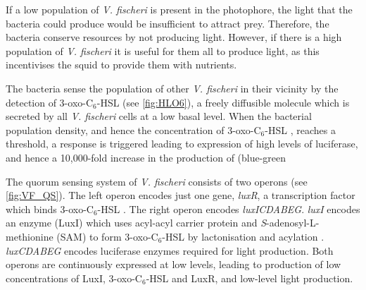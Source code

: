 If a low population  of \textit{V. fischeri} is  present  in  the  photophore,  the  light  that the bacteria could produce would  be insufficient to  attract prey. Therefore, the bacteria conserve resources by not producing light.
However, if there is a high population of \textit{V. fischeri} it is useful for them all to produce light, as this incentivises the squid to provide them with nutrients. 


The bacteria sense the population of other \textit{V. fischeri} in their vicinity by the detection of 3-oxo-C$_6$-HSL \cite{Eberhard1981} (see \ref{fig:HLO6}), a freely diffusible\cite{Kaplan1985} molecule which is secreted by all \textit{V. fischeri} cells\cite{Schaefer1996} at a low basal level\cite{Miller2001}. When the bacterial population density, and hence the concentration of 3-oxo-C$_6$-HSL , reaches a threshold, a response is triggered leading to expression of high levels of luciferase, and hence a 10,000-fold\cite{Devine1989} increase in the production of (blue-green%

The quorum sensing system of \textit{V. fischeri} consists of two operons (see \ref{fig:VF_QS}). The left operon encodes just one gene, \textit{luxR}, a transcription factor which binds 3-oxo-C$_6$-HSL . The right operon encodes \textit{luxICDABEG}. \textit{luxI} encodes an enzyme (LuxI) which uses acyl-acyl carrier protein and \textit{S}-adenosyl-L-methionine (SAM) to form 3-oxo-C$_6$-HSL  by lactonisation and acylation \cite{Parsek1999, Watson2002}. \textit {luxCDABEG} encodes luciferase enzymes required for light production. Both operons are continuously expressed at low levels, leading to production of low concentrations of LuxI, 3-oxo-C$_6$-HSL  and LuxR, and low-level light production\cite{Engebrecht1983}. 

